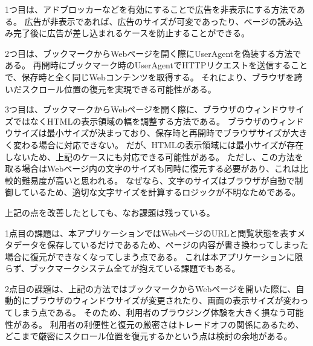 1つ目は、アドブロッカーなどを有効にすることで広告を非表示にする方法である。
広告が非表示であれば、広告のサイズが可変であったり、ページの読み込み完了後に広告が差し込まれるケースを防止することができる。

2つ目は、ブックマークからWebページを開く際にUserAgentを偽装する方法である。
再開時にブックマーク時のUserAgentでHTTPリクエストを送信することで、保存時と全く同じWebコンテンツを取得する。
それにより、ブラウザを跨いだスクロール位置の復元を実現できる可能性がある。

3つ目は、ブックマークからWebページを開く際に、ブラウザのウィンドウサイズではなくHTMLの表示領域の幅を調整する方法である。
ブラウザのウィンドウサイズは最小サイズが決まっており、保存時と再開時でブラウザサイズが大きく変わる場合に対応できない。
だが、HTMLの表示領域には最小サイズが存在しないため、上記のケースにも対応できる可能性がある。
ただし、この方法を取る場合はWebページ内の文字のサイズも同時に復元する必要があり、これは比較的難易度が高いと思われる。
なぜなら、文字のサイズはブラウザが自動で制御しているため、適切な文字サイズを計算するロジックが不明なためである。

上記の点を改善したとしても、なお課題は残っている。

1点目の課題は、本アプリケーションではWebページのURLと閲覧状態を表すメタデータを保存しているだけであるため、ページの内容が書き換わってしまった場合に復元ができなくなってしまう点である。
これは本アプリケーションに限らず、ブックマークシステム全てが抱えている課題でもある。

2点目の課題は、上記の方法ではブックマークからWebページを開いた際に、自動的にブラウザのウィンドウサイズが変更されたり、画面の表示サイズが変わってしまう点である。
そのため、利用者のブラウジング体験を大きく損なう可能性がある。
利用者の利便性と復元の厳密さはトレードオフの関係にあるため、どこまで厳密にスクロール位置を復元するかという点は検討の余地がある。